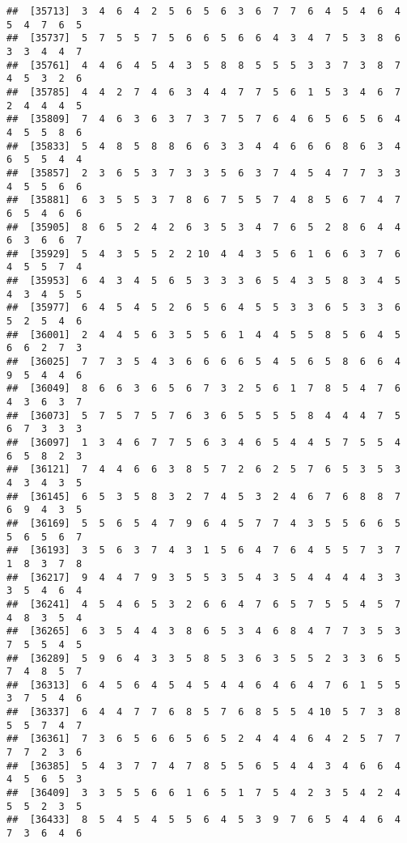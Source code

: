 \documentclass[
]{book}
\begin{document}
\begin{verbatim}
##  [35713]  3  4  6  4  2  5  6  5  6  3  6  7  7  6  4  5  4  6  4  5  4  7  6  5
##  [35737]  5  7  5  5  7  5  6  6  5  6  6  4  3  4  7  5  3  8  6  3  3  4  4  7
##  [35761]  4  4  6  4  5  4  3  5  8  8  5  5  5  3  3  7  3  8  7  4  5  3  2  6
##  [35785]  4  4  2  7  4  6  3  4  4  7  7  5  6  1  5  3  4  6  7  2  4  4  4  5
##  [35809]  7  4  6  3  6  3  7  3  7  5  7  6  4  6  5  6  5  6  4  4  5  5  8  6
##  [35833]  5  4  8  5  8  8  6  6  3  3  4  4  6  6  6  8  6  3  4  6  5  5  4  4
##  [35857]  2  3  6  5  3  7  3  3  5  6  3  7  4  5  4  7  7  3  3  4  5  5  6  6
##  [35881]  6  3  5  5  3  7  8  6  7  5  5  7  4  8  5  6  7  4  7  6  5  4  6  6
##  [35905]  8  6  5  2  4  2  6  3  5  3  4  7  6  5  2  8  6  4  4  6  3  6  6  7
##  [35929]  5  4  3  5  5  2  2 10  4  4  3  5  6  1  6  6  3  7  6  4  5  5  7  4
##  [35953]  6  4  3  4  5  6  5  3  3  3  6  5  4  3  5  8  3  4  5  4  3  4  5  5
##  [35977]  6  4  5  4  5  2  6  5  6  4  5  5  3  3  6  5  3  3  6  5  2  5  4  6
##  [36001]  2  4  4  5  6  3  5  5  6  1  4  4  5  5  8  5  6  4  5  6  6  2  7  3
##  [36025]  7  7  3  5  4  3  6  6  6  6  5  4  5  6  5  8  6  6  4  9  5  4  4  6
##  [36049]  8  6  6  3  6  5  6  7  3  2  5  6  1  7  8  5  4  7  6  4  3  6  3  7
##  [36073]  5  7  5  7  5  7  6  3  6  5  5  5  5  8  4  4  4  7  5  6  7  3  3  3
##  [36097]  1  3  4  6  7  7  5  6  3  4  6  5  4  4  5  7  5  5  4  6  5  8  2  3
##  [36121]  7  4  4  6  6  3  8  5  7  2  6  2  5  7  6  5  3  5  3  4  3  4  3  5
##  [36145]  6  5  3  5  8  3  2  7  4  5  3  2  4  6  7  6  8  8  7  6  9  4  3  5
##  [36169]  5  5  6  5  4  7  9  6  4  5  7  7  4  3  5  5  6  6  5  5  6  5  6  7
##  [36193]  3  5  6  3  7  4  3  1  5  6  4  7  6  4  5  5  7  3  7  1  8  3  7  8
##  [36217]  9  4  4  7  9  3  5  5  3  5  4  3  5  4  4  4  4  3  3  3  5  4  6  4
##  [36241]  4  5  4  6  5  3  2  6  6  4  7  6  5  7  5  5  4  5  7  4  8  3  5  4
##  [36265]  6  3  5  4  4  3  8  6  5  3  4  6  8  4  7  7  3  5  3  7  5  5  4  5
##  [36289]  5  9  6  4  3  3  5  8  5  3  6  3  5  5  2  3  3  6  5  7  4  8  5  7
##  [36313]  6  4  5  6  4  5  4  5  4  4  6  4  6  4  7  6  1  5  5  3  7  5  4  6
##  [36337]  6  4  4  7  7  6  8  5  7  6  8  5  5  4 10  5  7  3  8  5  5  7  4  7
##  [36361]  7  3  6  5  6  6  5  6  5  2  4  4  4  6  4  2  5  7  7  7  7  2  3  6
##  [36385]  5  4  3  7  7  4  7  8  5  5  6  5  4  4  3  4  6  6  4  4  5  6  5  3
##  [36409]  3  3  5  5  6  6  1  6  5  1  7  5  4  2  3  5  4  2  4  5  5  2  3  5
##  [36433]  8  5  4  5  4  5  5  6  4  5  3  9  7  6  5  4  4  6  4  7  3  6  4  6

\end{verbatim}
\end{document}
